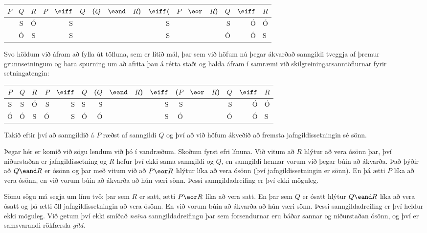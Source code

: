\begin{center}
	\begin{tabular}{c c c | d d f | d d d d d d f | d d f}
		$P$&$Q$&$R$&$P$&$\eiff$&$Q$&($Q$&$\eand$&$R$)&$\eiff$(&$P$&$\eor$&$R$)&$Q$&$\eiff$&$R$ \\
		\hline
		  & S & Ó & & S & & & & & S & & & & S & Ó & Ó \\
		  & Ó & S &  & S & & & & & S & & & & Ó& Ó & S\\
	\end{tabular}
\end{center}

Svo höldum við áfram að fylla út töfluna, sem er lítið mál, þar sem við höfum nú þegar ákvarðað sanngildi tveggja af þremur grunnsetningum og bara spurning um að afrita þau á rétta staði og halda áfram í samræmi við skilgreiningarsanntöflurnar fyrir setningatengin:

\begin{center}
	\begin{tabular}{c c c | d d f | d d d d d d f | d d f}
		$P$&$Q$&$R$&$P$&$\eiff$&$Q$&($Q$&$\eand$&$R$)&$\eiff$&($P$&$\eor$&$R$)&$Q$&$\eiff$&$R$ \\
		\hline
		 S & S & Ó & S & S & S & S & & & S & S & & & S & Ó & Ó \\
		 Ó & Ó & S & Ó & S & Ó & Ó & & & S & Ó & & & Ó & Ó & S \\
	\end{tabular}
\end{center}
Takið eftir því að sanngildið á $P$ ræðst af sanngildi $Q$ og því að við höfum ákveðið að fremsta jafngildissetningin sé sönn.

Þegar hér er komið við sögu lendum við þó í vandræðum. Skoðum fyrst efri línuna. Við vitum að $R$ hlýtur að vera ósönn þar, því niðurstaðan er jafngildissetning og $R$ hefur því ekki sama sanngildi og $Q$, en sanngildi hennar vorum við þegar búin að ákvarða. Það þýðir að $Q \eand R$ er ósönn og þar með vitum við að $P\eor R$ hlýtur líka að vera ósönn (því jafngildissetningin er sönn). En þá ætti $P$ líka að vera ósönn, en við vorum búin að ákvarða að hún væri sönn. Þessi sanngildadreifing er því ekki möguleg.

Sömu sögu má segja um línu tvö: þar sem $R$ er satt, ætti $P \eor R$ líka að vera satt. En þar sem $Q$ er ósatt hlýtur $Q \eand R$ líka að vera ósatt og þá ætti öll jafngildissetningin að vera ósönn. En við vorum búin að ákvarða að hún væri sönn. Þessi sanngildadreifing er því heldur ekki möguleg. Við getum því ekki smíðað \emph{neina} sanngildadreifingu þar sem forsendurnar eru báðar sannar og niðurstaðan ósönn, og því er samsvarandi rökfærsla \emph{gild}.



